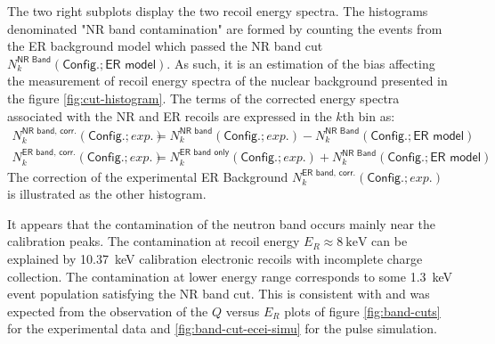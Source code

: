 The two right subplots display the two recoil energy spectra. The histograms denominated "NR band contamination" are formed by counting the events from the ER background model which passed the NR band cut $N_k^{\textsf{NR Band}}(\textsf{Config.}; \textsf{ER model})$. As such, it is an estimation of the bias affecting the measurement of recoil energy spectra of the nuclear background presented in the figure \ref{fig:cut-histogram}. 
The terms of the corrected energy spectra associated with the NR and ER recoils are expressed in the $k$th bin as:
\begin{align}
N_k^{\textsf{NR band, corr.}}(\textsf{Config.}; exp.)
&=
N_k^{\textsf{NR band}}(\textsf{Config.}; exp.)
-
N_k^{\textsf{NR Band}}(\textsf{Config.}; \textsf{ER model})
\\
N_k^{\textsf{ER band, corr.}}(\textsf{Config.}; exp.)
&=
N_k^{\textsf{ER band only}}(\textsf{Config.}; exp.)
+
N_k^{\textsf{NR Band}}(\textsf{Config.}; \textsf{ER model})
\end{align}
The correction of the experimental ER Background $N_k^{\textsf{ER band, corr.}}(\textsf{Config.}; exp.)$ is illustrated as the other histogram.

It appears that the contamination of the neutron band occurs mainly near the calibration peaks. The contamination at recoil energy $E_R \approx \SI{8}{\kilo\eV}$ can be explained by \SI{10.37}{\kilo\eV} calibration electronic recoils with incomplete charge collection. The contamination at lower energy range corresponds to some \SI{1.3}{\kilo\eV} event population satisfying the NR band cut. This is consistent with and was expected from the observation of the $Q$ versus $E_R$ plots of figure \ref{fig:band-cuts} for the experimental data and \ref{fig:band-cut-ecei-simu} for the pulse simulation.


